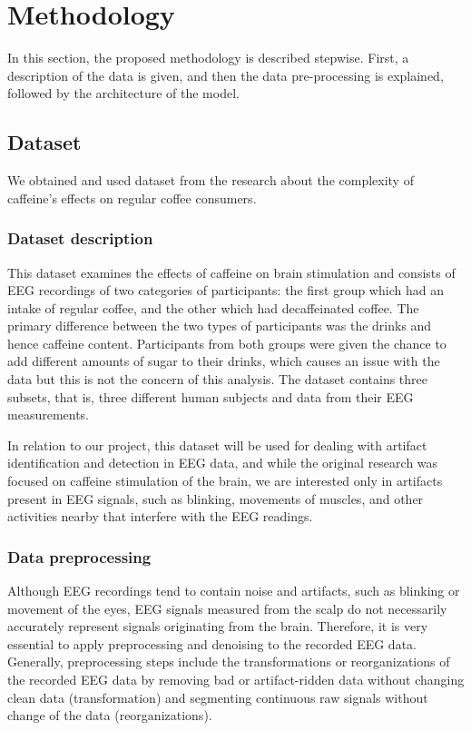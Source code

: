 \documentclass[12pt,a4paper,titlepage,openany]{report}
\begin{document}


\chapter{Methodology}
\thispagestyle{fancy}

In this section, the proposed methodology is described stepwise. First, a description of the data is given, and then the data pre-processing is explained, followed by the architecture of the model.

\section{Dataset}

We obtained and used dataset from the research about the complexity of caffeine's effects on regular coffee consumers\cite{lesar2025}.

\subsection{Dataset description}

This dataset examines the effects of caffeine on brain stimulation and consists of EEG recordings of two categories of participants: the first group which had an intake of regular coffee, and the other which had decaffeinated coffee. 
The primary difference between the two types of participants was the drinks and hence caffeine content. 
Participants from both groups were given the chance to add different amounts of sugar to their drinks, which causes an issue with the data but this is not the concern of this analysis.
The dataset contains three subsets, that is, three different human subjects and data from their EEG measurements.

In relation to our project, this dataset will be used for dealing with artifact identification and detection in EEG data, and while the original research was focused on caffeine stimulation of the brain, we are interested only in artifacts present in EEG signals, such as blinking, movements of muscles, and other activities nearby that interfere with the EEG readings.

\subsection{Data preprocessing}

Although EEG recordings tend to contain noise and artifacts, such as blinking or movement of the eyes, EEG signals measured from the scalp do not necessarily accurately represent signals originating from the brain. 
Therefore, it is very essential to apply preprocessing and denoising to the recorded EEG data. 
Generally, preprocessing steps include the transformations or reorganizations of the recorded EEG data by removing bad or artifact-ridden data without changing clean data (transformation) and segmenting continuous raw signals without change of the data (reorganizations).
\end{document}
